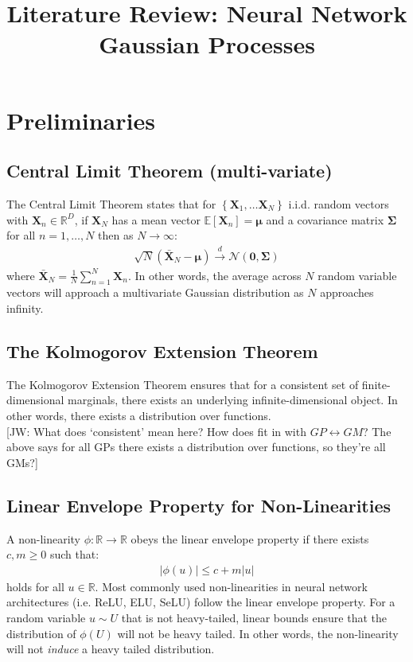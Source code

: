 \documentclass[twoside,11pt]{article}
\newcommand{\jw}[1]{{\color{gray} [JW: #1]}}
\begin{document}
\title{Literature Review: Neural Network Gaussian Processes}
\maketitle
\section{Preliminaries}
\subsection{Central Limit Theorem (multi-variate)}
The Central Limit Theorem states that for $\left\{ \mathbf{X}_1, \dots \mathbf{X}_N \right\}$ i.i.d. random vectors with $\mathbf{X}_n \in \mathbb{R}^D$, if $\mathbf{X}_N$ has a mean vector $\mathbb{E}\left[\mathbf{X}_n\right] = \boldsymbol{\mu}$ and a covariance matrix $\boldsymbol{\Sigma}$ for all $n=1, \dots, N$ then as $N \rightarrow \infty$:
\begin{align}
    \sqrt{N}\left(\bar{\mathbf{X}}_N-\boldsymbol{\mu}\right) \xrightarrow{d} \mathcal{N}\left(\mathbf{0}, \boldsymbol{\Sigma}\right)
\end{align}
where $\bar{\mathbf{X}}_N = \frac{1}{N}\sum_{n=1}^N \mathbf{X}_n$. In other words, the average across $N$ random variable vectors will approach a multivariate Gaussian distribution as $N$ approaches infinity.
\subsection{The Kolmogorov Extension Theorem \cite{agdeg1804gaussian}}
The Kolmogorov Extension Theorem ensures that for a consistent set of finite-dimensional marginals, there exists an underlying infinite-dimensional object. In other words, there exists a distribution over functions. 
\\\jw{What does `consistent' mean here? How does fit in with $GP \leftrightarrow GM$? The above says for all GPs there exists a distribution over functions, so they're all GMs?} 

\subsection{Linear Envelope Property for Non-Linearities \cite{agdeg1804gaussian}}
A non-linearity $\phi : \mathbb{R} \rightarrow \mathbb{R}$ obeys the linear envelope property if there exists $c, m \geq 0$ such that:
\begin{align}
    \label{linear-envelope}
    \left\vert \phi(u)\right\vert \leq c + m \left\vert u \right\vert
\end{align}
holds for all $u \in \mathbb{R}$. Most commonly used non-linearities in neural network architectures (i.e. ReLU, ELU, SeLU) follow the linear envelope property. For a random variable $u \sim U$ that is not heavy-tailed, linear bounds ensure that the distribution of $\phi(U)$ will not be heavy tailed. In other words, the non-linearity will not \textit{induce} a heavy tailed distribution.
\end{document}

